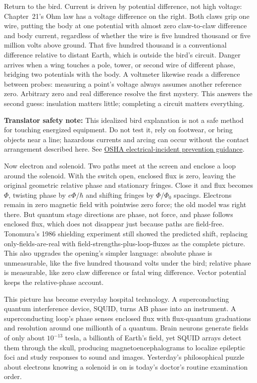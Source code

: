 \begin{mainline}
Return to the bird. Current is driven by potential difference, not high voltage: Chapter~21's Ohm law has a voltage difference on the right. Both claws grip one wire, putting the body at one potential with almost zero claw-to-claw difference and body current, regardless of whether the wire is five hundred thousand or five million volts above ground. That five hundred thousand is a conventional difference relative to distant Earth, which is outside the bird's circuit. Danger arrives when a wing touches a pole, tower, or second wire of different phase, bridging two potentials with the body. A voltmeter likewise reads a difference between probes: measuring a point's voltage always assumes another reference zero. Arbitrary zero and real difference resolve the first mystery. This answers the second guess: insulation matters little; completing a circuit matters everything.

\textbf{Translator safety note:} This idealized bird explanation is not a safe method for touching energized equipment. Do not test it, rely on footwear, or bring objects near a line; hazardous currents and arcing can occur without the contact arrangement described here. See \href{https://www.osha.gov/etools/construction/electrical-incidents/}{OSHA electrical-incident prevention guidance}.

Now electron and solenoid. Two paths meet at the screen and enclose a loop around the solenoid. With the switch open, enclosed flux is zero, leaving the original geometric relative phase and stationary fringes. Close it and flux becomes \(\Phi\), twisting phase by \(e\Phi/\hbar\) and shifting fringes by \(\Phi/\Phi_0\) spacings. Electrons remain in zero magnetic field with pointwise zero force; the old model was right there. But quantum stage directions are phase, not force, and phase follows enclosed flux, which does not disappear just because paths are field-free. Tonomura's 1986 shielding experiment still showed the predicted shift, replacing only-fields-are-real with field-strengths-plus-loop-fluxes as the complete picture. This also upgrades the opening's simpler language: absolute phase is unmeasurable, like the five hundred thousand volts under the bird; relative phase is measurable, like zero claw difference or fatal wing difference. Vector potential keeps the relative-phase account.

This picture has become everyday hospital technology. A superconducting quantum interference device, SQUID, turns AB phase into an instrument. A superconducting loop's phase senses enclosed flux with flux-quantum graduations and resolution around one millionth of a quantum. Brain neurons generate fields of only about \(10^{-13}\) tesla, a billionth of Earth's field, yet SQUID arrays detect them through the skull, producing magnetoencephalograms to localize epileptic foci and study responses to sound and images. Yesterday's philosophical puzzle about electrons knowing a solenoid is on is today's doctor's routine examination order.
\end{mainline}

